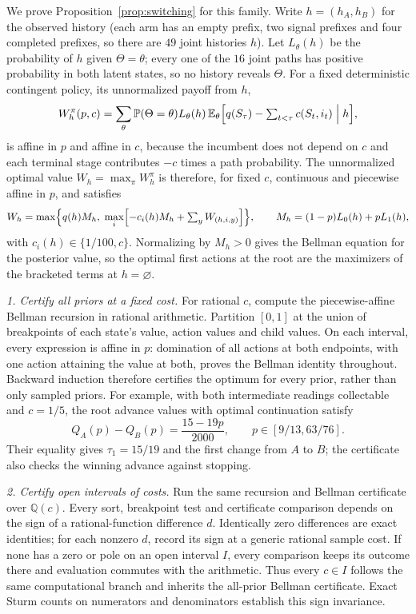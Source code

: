 We prove Proposition~\ref{prop:switching} for this family. Write $h=(h_A,h_B)$ for the observed history (each arm has an empty prefix, two
signal prefixes and four completed prefixes, so there are $49$ joint histories
$h$). Let $L_\theta(h)$ be the probability of $h$ given $\Theta=\theta$; every
one of the $16$ joint paths has positive probability in both latent states, so
no history reveals $\Theta$. For a fixed deterministic contingent policy, its
unnormalized payoff from $h$,
\[
 W^\pi_h(p,c)=\sum_\theta \mathbb{P}(\Theta=\theta)L_\theta(h)\,
 \mathbb{E}_\theta\Bigl[q(S_\tau)-\textstyle\sum_{t<\tau}c(S_t,i_t)\Bigm| h\Bigr],
\]
is affine in $p$ and affine in $c$, because the incumbent does not depend on
$c$ and each terminal stage contributes $-c$ times a path probability. The
unnormalized optimal value $W_h=\max_\pi W^\pi_h$ is therefore, for fixed $c$,
continuous and piecewise affine in $p$, and satisfies
\[
 W_h=\max\Bigl\{q(h)M_h,\;
 \max_{i}\Bigl[-c_i(h)M_h+\textstyle\sum_{y}W_{(h,i,y)}\Bigr]\Bigr\},
 \qquad M_h=(1-p)L_0(h)+pL_1(h),
\]
with $c_i(h)\in\{1/100,c\}$. Normalizing by $M_h>0$ gives the Bellman equation
for the posterior value, so the optimal first actions at the root are the
maximizers of the bracketed terms at $h=\varnothing$.

\emph{1. Certify all priors at a fixed cost.}
For rational $c$, compute the piecewise-affine Bellman recursion in rational
arithmetic. Partition $[0,1]$ at the union of breakpoints of each state's value,
action values and child values. On each interval, every expression is affine
in $p$: domination of all actions at both endpoints, with one action attaining
the value at both, proves the Bellman identity throughout. Backward induction
therefore certifies the optimum for every prior, rather than only sampled priors.
For example, with both intermediate readings collectable and $c=1/5$, the root
advance values with optimal continuation satisfy
\[
 Q_A(p)-Q_B(p)=\frac{15-19p}{2000},
 \qquad p\in[9/13,63/76].
\]
Their equality gives $\tau_1=15/19$ and the first change from $A$ to $B$;
the certificate also checks the winning advance against stopping.

\emph{2. Certify open intervals of costs.}
Run the same recursion and Bellman certificate over $\mathbb Q(c)$.
Every sort, breakpoint test and certificate comparison depends on the sign of
a rational-function difference $d$. Identically zero differences are exact
identities; for each nonzero $d$, record its sign at a generic rational sample
cost. If none has a zero or pole on an open interval $I$, every comparison
keeps its outcome there and evaluation commutes with the arithmetic.
Thus every $c\in I$ follows the same computational branch and inherits the
all-prior Bellman certificate. Exact Sturm counts on numerators and
denominators establish this sign invariance.

